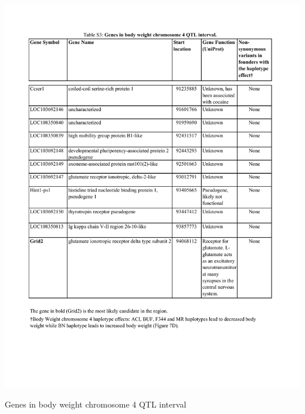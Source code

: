 \begin{table}
\centering
\includegraphics[page=1, trim={0in 1.5in 0in 0.95in}, clip, width=\textwidth]{figures/5-hsrats/supp_table_bodyweight_chr4.pdf}
\caption{Genes in body weight chromosome 4 QTL interval \label{tab:bodyweight_chr4_genes_1}}
\end{table}

\clearpage

